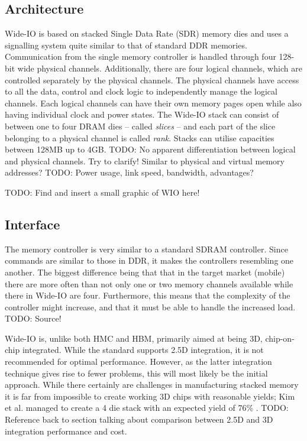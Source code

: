 \subsection{Architecture}
Wide-IO is based on stacked Single Data Rate (SDR) memory dies and uses a signalling system quite similar to that of standard DDR memories. Communication from the single memory controller is handled through four 128-bit wide physical channels. Additionally, there are four logical channels, which are controlled separately by the physical channels. The physical channels have access to all the data, control and clock logic to independently manage the logical channels. Each logical channels can have their own memory pages open while also having individual clock and power states. The Wide-IO stack can consist of between one to four DRAM dies -- called \emph{slices} -- and each part of the slice belonging to a physical channel is called \emph{rank}. Stacks can utilise capacities between 128MB up to 4GB. TODO: No apparent differentiation between logical and physical channels. Try to clarify! Similar to physical and virtual memory addresses? 
TODO: Power usage, link speed, bandwidth, advantages?

TODO: Find and insert a small graphic of WIO here!

\subsection{Interface}
The memory controller is very similar to a standard SDRAM controller. Since commands are similar to those in DDR, it makes the controllers resembling one another. The biggest difference being that that in the target market (mobile) there are more often than not only one or two memory channels available while there in Wide-IO are four. Furthermore, this means that the complexity of the controller might increase, and that it must be able to handle the increased load. TODO: Source!
\bigskip

Wide-IO is, unlike both HMC and HBM, primarily aimed at being 3D, chip-on-chip integrated. While the standard supports 2.5D integration, it is not recommended for optimal performance. However, as the latter integration technique gives rise to fewer problems, this will most likely be the initial approach. While there certainly are challenges in manufacturing stacked memory it is far from impossible to create working 3D chips with reasonable yields; Kim et al. managed to create a 4 die stack with an expected yield of 76\% \cite{kim20121}. TODO: Reference back to section talking about comparison between 2.5D and 3D integration performance and cost.


